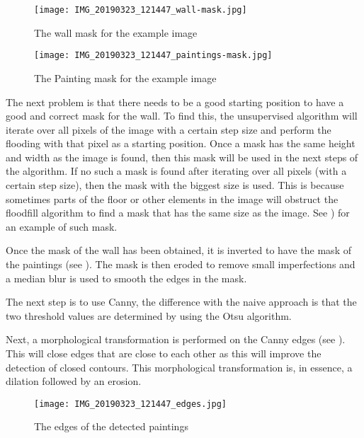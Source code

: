 \begin{figure}[h]
    \centering
    \begin{minipage}[b]{0.45\textwidth}
        \texttt{[image: IMG\_20190323\_121447\_wall-mask.jpg]}
        \caption{The wall mask for the example image}
        \label{fig:paiting_detection_wall-mask}
    \end{minipage}
    \hfill
    \begin{minipage}[b]{0.45\textwidth}
        \texttt{[image: IMG\_20190323\_121447\_paintings-mask.jpg]}
        \caption{The Painting mask for the example image}
        \label{fig:paiting_detection_paintings-mask}
    \end{minipage}
\end{figure}

The next problem is that there needs to be a good starting position to have a good and correct mask for the wall. To find this, the unsupervised algorithm will iterate over all pixels of the image with a certain step size and perform the flooding with that pixel as a starting position. Once a mask has the same height and width as the image is found, then this mask will be used in the next steps of the algorithm. If no such a mask is found after iterating over all pixels (with a certain step size), then the mask with the biggest size is used. This is because sometimes parts of the floor or other elements in the image will obstruct the floodfill algorithm to find a mask that has the same size as the image. See ) for an example of such mask.

Once the mask of the wall has been obtained, it is inverted to have the mask of the paintings (see ). The mask is then eroded to remove small imperfections and a median blur is used to smooth the edges in the mask.

The next step is to use Canny, the difference with the naive approach is that the two threshold values are determined by using the Otsu algorithm.

Next, a morphological transformation is performed on the Canny edges (see ). This will close edges that are close to each other as this will improve the detection of closed contours. This morphological transformation is, in essence, a dilation followed by an erosion.

\begin{figure}[ht]
    \texttt{[image: IMG\_20190323\_121447\_edges.jpg]}
    \centering
    \caption{The edges of the detected paintings}
    \label{fig:paiting_detection_paintings-edges}
\end{figure}

